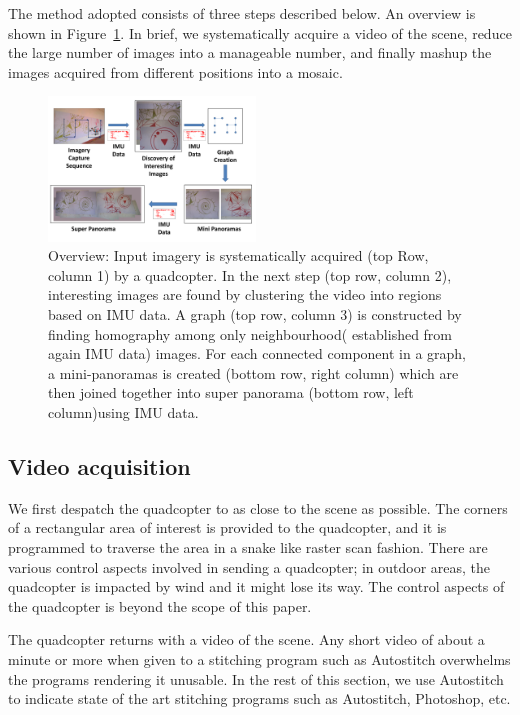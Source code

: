 \documentclass[10pt,twocolumn,letterpaper]{article}
\begin{document}
The method adopted consists of three steps described below. An
overview is shown in Figure~\ref{fig:workflow}.  In brief, we
systematically acquire a video of the scene, reduce the large number
of images into a manageable number, and finally mashup the images
acquired from different positions into a mosaic.

\begin{figure}[b!]
  \centering
  \includegraphics[width=0.49\textwidth]{figures/Workflow} 
  \caption{ \label{fig:workflow} Overview: Input imagery is
    systematically acquired (top Row, column 1) by a quadcopter.  In the next
    step (top row, column 2), interesting images are found by clustering
    the video into regions based on IMU data.  A graph (top row, column 3) is
    constructed by finding homography among only neighbourhood(
    established from again IMU data) images. For each connected component in a
    graph, a mini-panoramas is created (bottom row, right column) which are then
    joined together into super panorama (bottom row, left column)using IMU
    data.}
\end{figure}    


\subsection{Video acquisition}
We first despatch the quadcopter to as close to the scene as
possible. The corners of a rectangular area of interest is provided to
the quadcopter, and it is programmed to traverse the area in a snake
like raster scan fashion.  There are various control aspects involved
in sending a quadcopter; in outdoor areas, the quadcopter is impacted
by wind and it might lose its way.  The control aspects of the
quadcopter is beyond the scope of this paper.

The quadcopter returns with a video of the scene.  Any short video of
about a minute or more when given to a stitching program such as
Autostitch overwhelms the programs rendering it unusable. In the rest
of this section, we use Autostitch to indicate state of the art
stitching programs such as Autostitch, Photoshop, etc.
\end{document}
